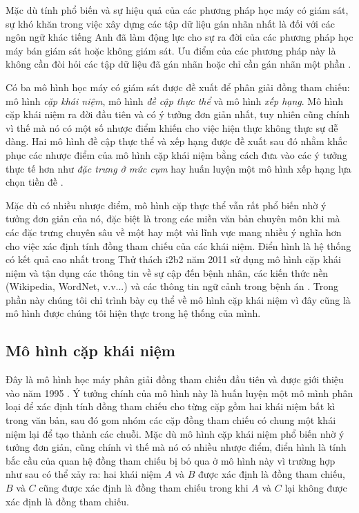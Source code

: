 Mặc dù tính phổ biến và sự hiệu quả của các phương pháp học máy có giám sát, sự khó khăn trong việc xây dựng các tập dữ liệu gán nhãn nhất là đối với các ngôn ngữ khác tiếng Anh đã làm động lực cho sự ra đời của các phương pháp học máy bán giám sát hoặc không giám sát. Ưu điểm của các phương pháp này là không cần đòi hỏi các tập dữ liệu đã gán nhãn hoặc chỉ cần gán nhãn một phần \cite{CardieWagstaff1999}.

Có ba mô hình học máy có giám sát được đề xuất để phân giải đồng tham chiếu: mô hình \emph{cặp khái niệm}, mô hình \emph{đề cập thực thể} và mô hình \emph{xếp hạng}. Mô hình cặp khái niệm ra đời đầu tiên và có ý tưởng đơn giản nhất, tuy nhiên cũng chính vì thế mà nó có một số nhược điểm khiến cho việc hiện thực không thực sự dễ dàng. Hai mô hình đề cập thực thể và xếp hạng được đề xuất sau đó nhằm khắc phục các nhược điểm của mô hình cặp khái niệm bằng cách đưa vào các ý tưởng thực tế hơn như \emph{đặc trưng ở mức cụm} \cite{Yang2004} hay huấn luyện một mô hình xếp hạng lựa chọn tiền đề \cite{Yang2003}.

Mặc dù có nhiều nhược điểm, mô hình cặp thực thể vẫn rất phổ biến nhờ ý tưởng đơn giản của nó, đặc biệt là trong các miền văn bản chuyên môn khi mà các đặc trưng chuyên sâu về một hay một vài lĩnh vực mang nhiều ý nghĩa hơn cho việc xác định tính đồng tham chiếu của các khái niệm. Điển hình là hệ thống có kết quả cao nhất trong Thử thách i2b2 năm 2011 sử dụng mô hình cặp khái niệm và tận dụng các thông tin về sự cập đến bệnh nhân, các kiến thức nền (Wikipedia, WordNet, v.v...) và các thông tin ngữ cảnh trong bệnh án \cite{YanXu2012}. Trong phần này chúng tôi chỉ trình bày cụ thể về mô hình cặp khái niệm vì đây cũng là mô hình được chúng tôi hiện thực trong hệ thống của mình.

\subsection*{Mô hình cặp khái niệm}
Đây là mô hình học máy phân giải đồng tham chiếu đầu tiên và được giới thiệu vào năm 1995 \cite{Aone&Bennett1995}. Ý tưởng chính của mô hình này là huấn luyện một mô mình phân loại để xác định tính đồng tham chiếu cho từng cặp gồm hai khái niệm bất kì trong văn bản, sau đó gom nhóm các cặp đồng tham chiếu có chung một khái niệm lại để tạo thành các chuỗi. Mặc dù mô hình cặp khái niệm phổ biến nhờ ý tưởng đơn giản, cũng chính vì thế mà nó có nhiều nhược điểm, điển hình là tính bắc cầu của quan hệ đồng tham chiếu bị bỏ qua ở mô hình này vì trường hợp như sau có thể xảy ra: hai khái niệm $A$ và $B$ được xác định là đồng tham chiếu, $B$ và $C$ cũng được xác định là đồng tham chiếu trong khi $A$ và $C$ lại không được xác định là đồng tham chiếu.

